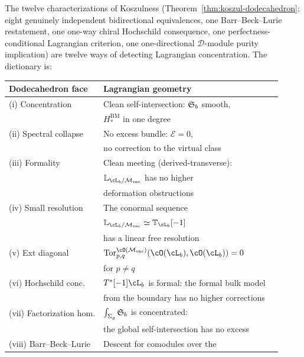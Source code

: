 \begin{conjecture}
\label{conj:dodecahedron-lagrangian}
The twelve characterizations of Koszulness
\textup{(}Theorem~\textup{\ref{thm:koszul-dodecahedron}};
eight genuinely independent bidirectional equivalences, one
Barr--Beck--Lurie restatement, one one-way chiral Hochschild
consequence, one perfectness-conditional Lagrangian criterion,
one one-directional $\mathcal{D}$-module purity implication\textup{)} are twelve
ways of detecting Lagrangian concentration. The dictionary is:
\begin{center}
\renewcommand{\arraystretch}{1.3}
\begin{tabular}{@{}lll@{}}
\toprule
\textbf{Dodecahedron face} & \textbf{Lagrangian geometry} \\
\midrule
\textup{(i)} Concentration &
 Clean self-intersection: $\mathfrak{S}_b$ smooth, \\
 & $H_*^{\mathrm{BM}}$ in one degree \\
\textup{(ii)} Spectral collapse &
 No excess bundle: $\mathcal{E} = 0$, \\
 & no correction to the virtual class \\
\textup{(iii)} Formality &
 Clean meeting (derived-transverse): \\
 & $\mathbb{L}_{\cL_b/\Mvac}$ has no higher \\
 & deformation obstructions \\
\textup{(iv)} Small resolution &
 The conormal sequence \\
 & $\mathbb{L}_{\cL_b/\Mvac} \simeq \mathbb{T}_{\cL_b}[-1]$ \\
 & has a linear free resolution \\
\textup{(v)} Ext diagonal &
 $\mathrm{Tor}^{\cO(\Mvac)}_{p,q}(\cO(\cL_b), \cO(\cL_b)) = 0$ \\
 & for $p \neq q$ \\
\textup{(vi)} Hochschild conc. &
 $T^*[-1]\cL_b$ is formal: the formal bulk model \\
 & from the boundary has no higher corrections \\
\textup{(vii)} Factorization hom. &
 $\int_{\Sigma_g} \mathfrak{S}_b$ is concentrated: \\
 & the global self-intersection has no excess \\
\textup{(viii)} Barr--Beck--Lurie &
 Descent for comodules over the \\

\end{tabular}
\end{center}
\end{conjecture}
